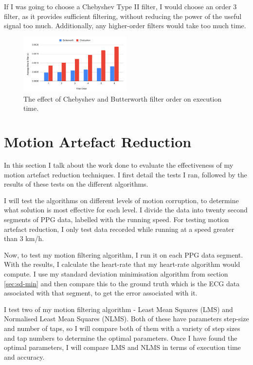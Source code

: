 \documentclass[12pt,a4paper,twoside,openany]{report}
\begin{document}
If I was going to choose a Chebyshev Type II filter, I would choose an order 3
filter, as it provides sufficient filtering, without reducing the power of the
useful signal too much. Additionally, any higher-order filters would take too
much time.

\begin{figure}[tbh]
	\centerline{\includegraphics[width=0.5\textwidth]{figs/cheby2andbutter-time.png}}
	\caption{The effect of Chebyshev and Butterworth filter order on execution time.}
	\label{fig:cheby2-time}
\end{figure}


\section{Motion Artefact Reduction}

In this section I talk about the work done to evaluate the effectiveness of my
motion artefact reduction techniques. 
I first detail the tests I
ran, followed by the results of these tests on the different algorithms.

I will test the algorithms on different levels of motion corruption, to
determine what solution is most effective for each level. I divide the
data into twenty second segments of PPG data, labelled with the running speed. For
testing motion artefact reduction, I only test data recorded while running at
a speed greater than 3 km/h.

Now, to test my motion filtering algorithm, I run it on each PPG data segment. 
With the results, I calculate the heart-rate that my
heart-rate algorithm would compute. 
I use my standard deviation minimisation algorithm from section \ref{sec:sd-min}
and then compare this to the
ground truth which is the ECG data associated with that segment, to get the
error associated with it.

I test two of my motion filtering algorithm - Least Mean Squares (LMS) and Normalised Least Mean
Squares (NLMS). Both of these have parameters step-size and number of taps, so I will
compare both of them with a variety of step sizes and tap numbers to determine
the optimal parameters. Once I have found the optimal parameters, I will
compare LMS and NLMS in terms of execution time and accuracy.
\end{document}
